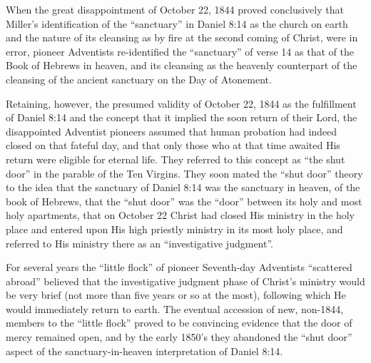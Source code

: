 When the great disappointment of October 22, 1844 proved conclusively that
Miller's identification of the ``sanctuary'' in Daniel 8:14 as the church on
earth and the nature of its cleansing as by fire at the second coming of
Christ,
 were in error, pioneer Adventists re-identified the ``sanctuary'' of
verse 14 as that of the Book of Hebrews in heaven, and its cleansing as the heavenly counterpart of the cleansing
of the ancient sanctuary on the Day of Atonement.

Retaining, however, the presumed validity of October 22, 1844 as the
fulfillment of Daniel 8:14 and the concept that it implied the soon return
of their Lord, the disappointed Adventist pioneers assumed that human
probation had indeed closed on that fateful day, and that only those who at 
that time awaited His return were eligible for eternal life. They referred
to this concept as ``the shut door'' in the parable of the Ten
Virgins.
 They
soon mated the ``shut door'' theory to the idea that the sanctuary of Daniel
8:14 was the sanctuary in heaven, of the book of Hebrews, that the ``shut
door'' was the ``door'' between its holy and most holy apartments, that on
October 22 Christ had closed His ministry in the holy place and entered upon
His high priestly ministry in its most holy place, and referred to His
ministry there as an ``investigative judgment''.

For several years the ``little flock'' of pioneer Seventh-day Adventists
``scattered abroad'' believed that the investigative judgment phase of
Christ's ministry would be very brief (not more than five years or so at the
most)\cite{7},
 following which He would immediately return to earth. The eventual
accession of new, non-1844, members to the ``little flock'' proved to be
convincing evidence that the door of mercy remained open, and by the early
1850's they abandoned the ``shut door'' aspect of the sanctuary-in-heaven
interpretation of Daniel 8:14.

